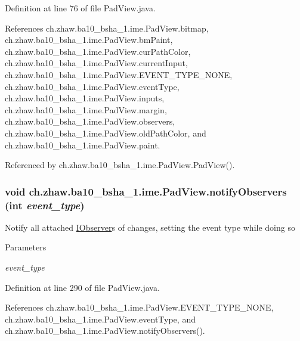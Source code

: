 Definition at line 76 of file PadView.java.

References ch.zhaw.ba10\_\-bsha\_\-1.ime.PadView.bitmap, ch.zhaw.ba10\_\-bsha\_\-1.ime.PadView.bmPaint, ch.zhaw.ba10\_\-bsha\_\-1.ime.PadView.curPathColor, ch.zhaw.ba10\_\-bsha\_\-1.ime.PadView.currentInput, ch.zhaw.ba10\_\-bsha\_\-1.ime.PadView.EVENT\_\-TYPE\_\-NONE, ch.zhaw.ba10\_\-bsha\_\-1.ime.PadView.eventType, ch.zhaw.ba10\_\-bsha\_\-1.ime.PadView.inputs, ch.zhaw.ba10\_\-bsha\_\-1.ime.PadView.margin, ch.zhaw.ba10\_\-bsha\_\-1.ime.PadView.observers, ch.zhaw.ba10\_\-bsha\_\-1.ime.PadView.oldPathColor, and ch.zhaw.ba10\_\-bsha\_\-1.ime.PadView.paint.

Referenced by ch.zhaw.ba10\_\-bsha\_\-1.ime.PadView.PadView().\hypertarget{classch_1_1zhaw_1_1ba10__bsha__1_1_1ime_1_1PadView_aa3a0e6aedfc80225bf47ce3cce17db27}{
\subsubsection[{notifyObservers}]{\setlength{\rightskip}{0pt plus 5cm}void ch.zhaw.ba10\_\-bsha\_\-1.ime.PadView.notifyObservers (int {\em event\_\-type})}}
\label{classch_1_1zhaw_1_1ba10__bsha__1_1_1ime_1_1PadView_aa3a0e6aedfc80225bf47ce3cce17db27}
Notify all attached \hyperlink{interfacech_1_1zhaw_1_1ba10__bsha__1_1_1ime_1_1IObserver}{IObserver}s of changes, setting the event type while doing so


\begin{DoxyParams}{Parameters}
\item[{\em event\_\-type}]\end{DoxyParams}


Definition at line 290 of file PadView.java.

References ch.zhaw.ba10\_\-bsha\_\-1.ime.PadView.EVENT\_\-TYPE\_\-NONE, ch.zhaw.ba10\_\-bsha\_\-1.ime.PadView.eventType, and ch.zhaw.ba10\_\-bsha\_\-1.ime.PadView.notifyObservers().

